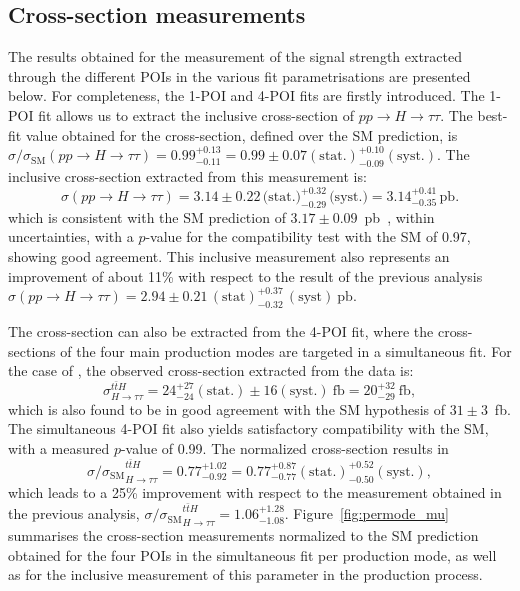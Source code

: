 \subsection{Cross-section measurements}
\label{xsect}

The results obtained for the measurement of the signal strength extracted through the different POIs in the various fit parametrisations are presented below. 
For completeness, the 1-POI and 4-POI fits are firstly introduced. The 1-POI fit allows us to extract the inclusive cross-section of $pp \to H \to \tau \tau$. The best-fit value obtained for the cross-section, defined over the SM prediction, is 
$\sigma / \sigma_{\text{SM}}(pp \to H \to \tau \tau) = 0.99^{+0.13}_{-0.11} = 0.99 \pm 0.07 (\text{stat.})^{+0.10}_{-0.09}(\text{syst.})$. 
The inclusive cross-section extracted from this measurement is:
\begin{equation}
  \sigma(pp \to H \to \tau\tau) 
  = 3.14 \pm 0.22 \, \text{(stat.)}^{+0.32}_{-0.29} \, \text{(syst.)} 
  = 3.14^{+0.41}_{-0.35} \, \text{pb}.
  \label{eq:htautau_xs}
  \end{equation}
  which is consistent with the SM prediction of $3.17 \pm 0.09$~pb~\cite{https://doi.org/10.23731/cyrm-2017-002}, within uncertainties, with a $p$-value for the compatibility test with the SM of 0.97, showing good agreement. This inclusive measurement also represents an improvement of about 11\% with respect to the result of the previous analysis $\sigma(pp \to H \to \tau\tau)  = 2.94 \pm 0.21\,(\text{stat})^{+0.37}_{-0.32}\,(\text{syst})~\text{pb}$.

  The \ttHtt cross-section can also be extracted from the 4-POI fit, where the cross-sections of the four main production modes are targeted in a simultaneous fit. For the case of \ttH, the observed cross-section extracted from the data is:
  \begin{equation}
    \sigma^{t\bar{t}H}_{H \to \tau \tau}
    = 24^{+27}_{-24}(\text{stat.}) \pm 16(\text{syst.})~\text{fb} 
    = 20^{+32}_{-29}~\text{fb},
  \end{equation}  
which is also found to be in good agreement with the SM hypothesis of $31 \pm 3$~fb. The simultaneous 4-POI fit also yields satisfactory compatibility with the SM, with a measured $p$-value of 0.99. 
The normalized cross-section results in 
\[
  {\sigma / \sigma_{\text{SM}}}^{t\bar{t}H}_{H \to \tau \tau} = 0.77^{+1.02}_{-0.92} = 0.77 ^{+0.87}_{-0.77}(\text{stat.})^{+0.52}_{-0.50}(\text{syst.}), 
\]
which leads to a 25\% improvement with respect to the measurement obtained in the previous analysis, ${\sigma / \sigma_{\text{SM}}}^{t\bar{t}H}_{H \to \tau \tau} = 1.06^{+1.28}_{-1.08}$.
Figure~\ref{fig:permode_mu} summarises the cross-section measurements normalized to the SM prediction obtained for the four POIs in the simultaneous fit per production mode, as well as for the inclusive measurement of this parameter in the \htautau production process.

